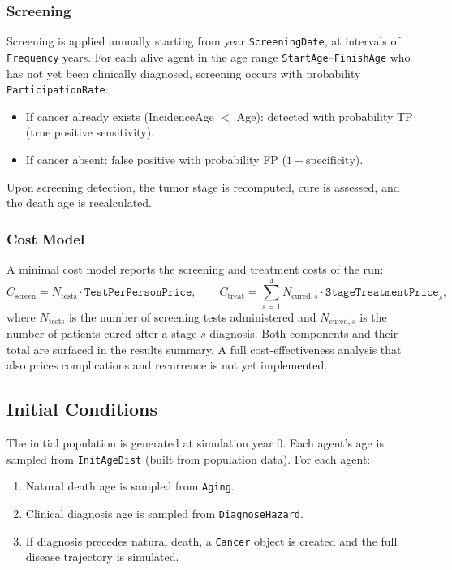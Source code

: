 \documentclass[12pt,a4paper]{article}
\begin{document}
\subsubsection{Screening}

Screening is applied annually starting from year \texttt{ScreeningDate}, at intervals of \texttt{Frequency} years. For each alive agent in the age range \texttt{StartAge}--\texttt{FinishAge} who has not yet been clinically diagnosed, screening occurs with probability \texttt{ParticipationRate}:

\begin{itemize}[nosep]
    \item If cancer already exists (IncidenceAge $<$ Age): detected with probability TP (true positive sensitivity).
    \item If cancer absent: false positive with probability FP ($1 - \text{specificity}$).
\end{itemize}

Upon screening detection, the tumor stage is recomputed, cure is assessed, and the death age is recalculated.

\subsubsection{Cost Model}

A minimal cost model reports the screening and treatment costs of the run:
\begin{equation}
    C_{\text{screen}} = N_{\text{tests}} \cdot \texttt{TestPerPersonPrice}, \qquad
    C_{\text{treat}} = \sum_{s=1}^{4} N_{\text{cured},s} \cdot \texttt{StageTreatmentPrice}_s,
\end{equation}
where $N_{\text{tests}}$ is the number of screening tests administered and $N_{\text{cured},s}$ is the number of patients cured after a stage-$s$ diagnosis. Both components and their total are surfaced in the results summary. A full cost-effectiveness analysis that also prices complications and recurrence is not yet implemented.

\subsection{Initial Conditions}

The initial population is generated at simulation year 0. Each agent's age is sampled from \texttt{InitAgeDist} (built from population data). For each agent:
\begin{enumerate}[nosep]
    \item Natural death age is sampled from \texttt{Aging}.
    \item Clinical diagnosis age is sampled from \texttt{DiagnoseHazard}.
    \item If diagnosis precedes natural death, a \texttt{Cancer} object is created and the full disease trajectory is simulated.
\end{enumerate}
\end{document}

